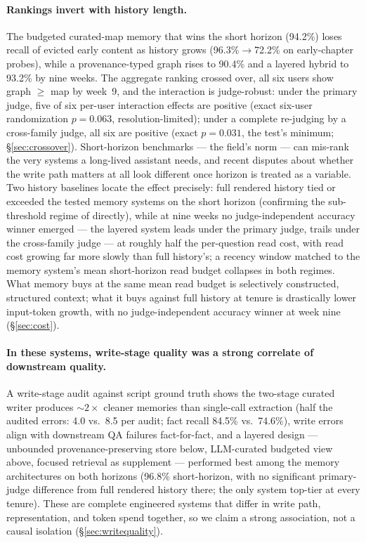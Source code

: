 \paragraph{Rankings invert with history length.} The budgeted curated-map
memory that wins the short horizon (94.2\%) loses recall of evicted early
content as history grows (96.3\%$\rightarrow$72.2\% on early-chapter
probes), while a provenance-typed graph rises to 90.4\% and a layered hybrid
to 93.2\% by nine weeks. The aggregate ranking crossed over, all six users
show graph $\geq$ map by week~9, and the interaction is judge-robust:
under the primary judge, five of six per-user interaction effects are
positive (exact six-user randomization $p=0.063$, resolution-limited);
under a complete re-judging by a cross-family judge, all six are positive
(exact $p=0.031$, the test's minimum; \S\ref{sec:crossover}). Short-horizon benchmarks
--- the field's norm \citep{mem0report2026} --- can mis-rank the very
systems a long-lived assistant needs, and recent disputes about whether the
write path matters at all \citep{derehag2026smartsearch,yuan2026bottlenecks}
look different once horizon is treated as a variable. Two history baselines
locate the effect precisely: full rendered history tied or exceeded the
tested memory systems on the short horizon (confirming the sub-threshold
regime of \citealp{convomem2025} directly), while at nine weeks no
judge-independent accuracy winner emerged --- the layered system leads
under the primary judge, trails under the cross-family judge --- at roughly
half the per-question read cost, with read cost growing far more slowly
than full history's; a recency window matched to the memory system's mean
short-horizon read budget collapses in both regimes. What memory buys at
the same mean read budget is selectively constructed, structured context;
what it buys against full history at tenure is drastically lower
input-token growth, with no judge-independent accuracy winner at week nine
(\S\ref{sec:cost}).

\paragraph{In these systems, write-stage quality was a strong correlate of
downstream quality.} A write-stage audit against script ground truth shows the
two-stage curated writer produces ${\sim}2\times$ cleaner memories than
single-call extraction (half the audited errors: 4.0 vs.\ 8.5 per audit; fact recall
84.5\% vs.\ 74.6\%), write errors align
with downstream QA failures fact-for-fact, and a layered design ---
unbounded provenance-preserving store below, LLM-curated budgeted view
above, focused retrieval as supplement --- performed best among the memory
architectures on both horizons (96.8\% short-horizon, with no significant
primary-judge difference from full rendered history there; the only system
top-tier at every tenure). These are complete engineered systems that differ in write path,
representation, and token spend together, so we claim a strong association,
not a causal isolation (\S\ref{sec:writequality}).

